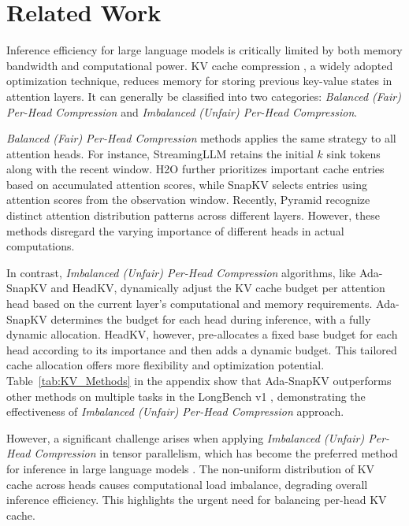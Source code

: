 \section{Related Work}

Inference efficiency for large language models is critically limited by both memory bandwidth and computational power. KV cache compression \cite{ge2024modeltellsdiscardadaptive, zhang2024h2o, yang2024pyramidinfer}, a widely adopted optimization technique, reduces memory for storing previous key-value states in attention layers. It can generally be classified into two categories: \textit{Balanced (Fair) Per-Head Compression} and \textit{Imbalanced (Unfair) Per-Head Compression}.

\textit{Balanced (Fair) Per-Head Compression} methods applies the same strategy to all attention heads. For instance, StreamingLLM \cite{xiao2024efficientstreaminglanguagemodels} retains the initial $k$ sink tokens along with the recent window. H2O \cite{zhang2024h2o} further prioritizes important cache entries based on accumulated attention scores, while SnapKV \cite{li2024snapkvllmknowslooking} selects entries using attention scores from the observation window. Recently, Pyramid \cite{yang2024pyramidinfer, cai2024pyramidkvdynamickvcache} recognize distinct attention distribution patterns across different layers. However, these methods disregard the varying importance of different heads in actual computations. 

In contrast, \textit{Imbalanced (Unfair) Per-Head Compression} algorithms, like Ada-SnapKV \cite{feng2024adakv} and HeadKV\cite{fu2024headsmatterheadlevelkv}, dynamically adjust the KV cache budget per attention head based on the current layer's computational and memory requirements. Ada-SnapKV determines the budget for each head during inference, with a fully dynamic allocation. HeadKV, however, pre-allocates a fixed base budget for each head according to its importance and then adds a dynamic budget. This tailored cache allocation offers more flexibility and optimization potential. Table~\ref{tab:KV_Methods} in the appendix show that Ada-SnapKV outperforms other methods on multiple tasks in the LongBench v1 \cite{bai2024longbenchbilingualmultitaskbenchmark}, demonstrating the effectiveness of \textit{Imbalanced (Unfair) Per-Head Compression} approach.

However, a significant challenge arises when applying \textit{Imbalanced (Unfair) Per-Head Compression} in tensor parallelism, which has become the preferred method for inference in large language models \cite{lu2017flexflow, shazeer2018mesh, shoeybi2019megatron, rajbhandari2020zero}. The non-uniform distribution of KV cache across heads causes computational load imbalance, degrading overall inference efficiency. This highlights the urgent need for balancing per-head KV cache.

